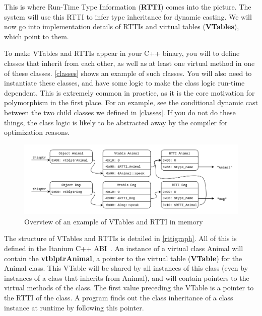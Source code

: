 \documentclass[a4paper,11pt,oneside]{report}
\begin{document}
This is where Run-Time Type Information (\textbf{RTTI}) comes into the picture.
The system will use this RTTI to infer type inheritance for dynamic casting.
We will now go into implementation details of RTTIs and virtual tables
(\textbf{VTables}), which point to them.

To make VTables and RTTIs appear in your C++ binary, you will to define
classes that inherit from each other, as well as at least one virtual method
in one of these classes.
\autoref{classes} shows an example of such classes.
You will also need to instantiate these classes, and have some logic to make
the class logic run-time dependent. 
This is extremely common in practice, as it is the core motivation for
polymorphism in the first place.
For an example, see the conditional dynamic cast between the two child classes
we defined in \autoref{classes}.
If you do not do these things, the class logic is likely to be abstracted away
by the compiler for optimization reasons.

\begin{figure}[h]

\includegraphics[width=16cm]{RTTI_graph.png}
\caption{Overview of an example of VTables and RTTI in memory}
\label{rttigraph}

\end{figure}

The structure of VTables and RTTIs is detailed in \autoref{rttigraph}.
All of this is defined in the Itanium C++ ABI~\cite{cppabi}.
An instance of a virtual class Animal will contain the \textbf{vtblptrAnimal}, 
a pointer to the virtual table (\textbf{VTable}) for the Animal class.
This VTable will be shared by all instances of this class (even by instances
of a class that inherits from Animal), and will contain pointers to the virtual
methods of the class.
The first value preceding the VTable is a pointer to the RTTI of the class. A
program finds out the class inheritance of a class instance at runtime by
following this pointer.
\end{document}
